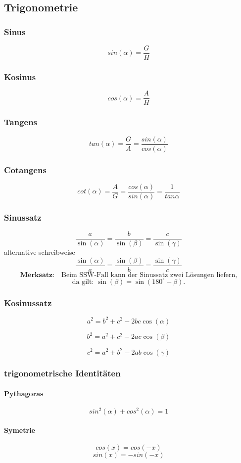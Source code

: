 \subsection{Trigonometrie}
\subsubsection{Sinus}
$$sin(\alpha)=\frac{G}{H}$$
\subsubsection{Kosinus}
$$cos(\alpha)=\frac{A}{H}$$
\subsubsection{Tangens}
$$tan(\alpha)=\frac{G}{A}=\frac{sin(\alpha)}{cos(\alpha)}$$
\subsubsection{Cotangens}
$$cot(\alpha)=\frac{A}{G}=\frac{cos(\alpha)}{sin(\alpha)}=\frac{1}{tan{\alpha}}$$
\subsubsection{Sinussatz}
$$
\frac{a}{\sin(\alpha)} = \frac{b}{\sin(\beta)} = \frac{c}{\sin(\gamma)}
$$
alternative schreibweise
$$
\frac{\sin(\alpha)}{a} = \frac{\sin(\beta)}{b} = \frac{\sin(\gamma)}{c}
$$
\[
\textbf{Merksatz:}\quad
\text{Beim SSW-Fall kann der Sinussatz zwei Lösungen liefern,}
\]
\[
\text{da gilt: }\sin(\beta) = \sin(180^\circ - \beta).
\]
\subsubsection{Kosinussatz}
$$
a^2 = b^2 + c^2 - 2bc \cos(\alpha)
$$

$$
b^2 = a^2 + c^2 - 2ac \cos(\beta)
$$

$$
c^2 = a^2 + b^2 - 2ab \cos(\gamma)
$$
\subsubsection{trigonometrische Identitäten}
\label{subsubsec:trigonometrische_identitäten}
\paragraph{Pythagoras}
$$sin^2(\alpha) + cos^2(\alpha) = 1$$
\paragraph{Symetrie}
$$cos(x)=cos(-x)$$
$$sin(x)=-sin(-x )$$
